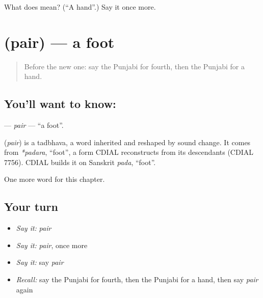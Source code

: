 \begin{tcolorbox}[breakable,colback=teal!4,colframe=teal!35!black,title={Before you move on}]
What does  mean? (\textquotedblleft{}A hand\textquotedblright{}.) Say it once more.
\end{tcolorbox}
\section[\texorpdfstring{\pa{ਪੈਰ} (pair)}{ਪੈਰ (pair)}]{ (pair) — a foot}

\label{lesson:PA-C49-pair}



\begin{quote}
Before the new one: say the Punjabi for fourth, then the Punjabi for a hand.
\end{quote}

\subsection*{You'll want to know: }
\textbf{} — \emph{pair} — \textquotedblleft{}a foot\textquotedblright{}.

\begin{cousinweb}
\textbf{} (\emph{pair}) is a tadbhava, a word inherited and reshaped by sound change. It comes from \emph{*padara}, \textquotedblleft{}foot\textquotedblright{}, a form CDIAL reconstructs from its descendants (CDIAL 7756). CDIAL builds it on Sanskrit \emph{pada}, \textquotedblleft{}foot\textquotedblright{}.
\end{cousinweb}

\begin{grammarlens}[title={What you've built}]
One more word for this chapter.
\end{grammarlens}

\subsection*{Your turn}
\begin{itemize}
\raggedright
  \item \emph{Say it:} \emph{pair}
  \item \emph{Say it:} \emph{pair}, once more
  \item \emph{Say it:} say \emph{pair}
  \item \emph{Recall:} say the Punjabi for fourth, then the Punjabi for a hand, then say \emph{pair} again
\end{itemize}

